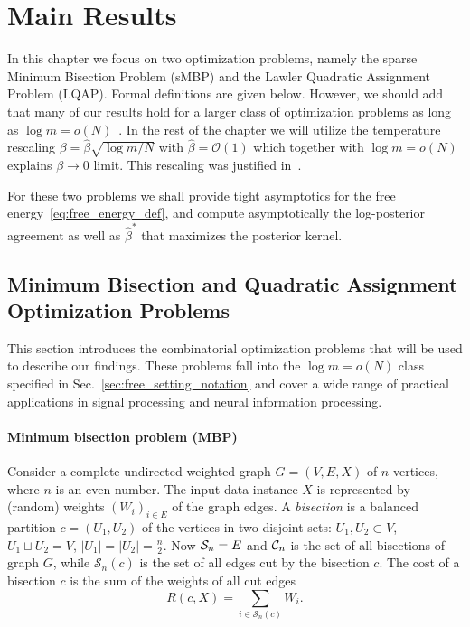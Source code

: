 \section{Main Results}
\label{sec:free_main_results}

In this chapter we focus on two optimization problems, namely the sparse Minimum
Bisection Problem (sMBP) and the Lawler Quadratic Assignment Problem (LQAP).
Formal definitions are given below. However, we should add that many of our
results hold for a larger class of optimization problems as long as $\log
m=o(N)$~\citep[see][]{ws95optimization}.  In the rest of the chapter we will
utilize the temperature rescaling $\beta = \hat \beta \sqrt{\log m/N}$ with
$\hat \beta = \mathcal{O}(1)$ which together with $\log m = o(N)$ explains $\beta
\to 0$ limit. This rescaling was justified in~\citep{aofa2014}.

For these two problems  we shall provide  
 tight asymptotics for the free energy~\eqref{eq:free_energy_def}, and
compute asymptotically the log-posterior agreement as well as $\hat \beta^*$
that maximizes the posterior kernel.

\subsection{Minimum Bisection and Quadratic Assignment Optimization Problems}
\label{sec:free_opt_problem_under_consideration}

This section introduces the combinatorial optimization problems that will be used to
describe our findings. These problems fall into the $\log m = o(N)$ class
specified in Sec.~\ref{sec:free_setting_notation} and cover a wide range of
practical applications in signal processing and neural information processing.

\paragraph{Minimum bisection problem (MBP)} 
\label{sec:free_mbp-problem}
Consider a complete undirected weighted graph $G=(V,E,X)$ of $n$ vertices, where
$n$ is an even number. The input data instance $X$ is represented by (random) weights
$(W_i)_{i\in E}$ of the graph edges.
A \textit{bisection} is a balanced partition $c=(U_1,U_2)$ of the vertices in two
disjoint sets: $U_1, U_2\subset V$, $U_1 \sqcup U_2 = V$,
$|U_1|=|U_2|=\frac{n}{2}$. 
Now $\S_n = E$ and $\C_n$ is the set of all bisections of graph
$G$, while $\mathcal{S}_n(c)$ is the set of all edges cut by the bisection $c$.
The cost of a bisection $c$ is the sum of the weights of all cut edges
\begin{equation}
  R(c, X) = \sum_{i\in\mathcal{S}_n(c)} W_i.
\end{equation}
%
%
%


